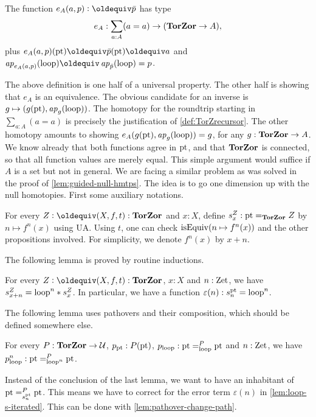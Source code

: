 \documentclass[a4,12pt]{amsart}
\begin{document}
\begin{definition}\label{def:TorZrecursor}
The function $e_A(a,p) \defeq \bar{p}$ has type
\[
e_A : \sum_{a:A}(a=a) \to (\mathbf{TorZor} \to A),
\]
plus $e_A(a,p)(\pt) \jdeq \bar{p}(\pt) \jdeq a$ and 
$\ap{e_A(a,p)}(\Zloop)\jdeq\ap{\bar{p}}(\Zloop) = p$.
\end{definition}

The above definition is one half of a universal property.
The other half is showing that $e_A$ is an equivalence.
The obvious candidate for an inverse is 
$g\mapsto (g({\mathord{\mathrm{pt}}}),\mathop{{\it ap}_{g}}(\mathrm{loop}))$.
The homotopy for the roundtrip starting in $\sum_{a:A}(a=a)$
is precisely the justification of \cref{def:TorZrecursor}.
The other homotopy amounts to showing
$e_A(g({\mathord{\mathrm{pt}}}),\mathop{{\it ap}_{g}}(\mathrm{loop})) = g$, for any $g:\mathbf{TorZor}\to A$.
We know already that both functions agree in ${\mathord{\mathrm{pt}}}$,
and that $\mathbf{TorZor}$ is connected, so that all function values
are merely equal. This simple argument would suffice if
$A$ is a set but not in general. We are facing a similar
problem as was solved in the proof of \cref{lem:guided-null-hmtps}.
The idea is to go one dimension up with the null homotopies.
First some auxiliary notations.

\begin{definition}\label{def:loop-s-iterated}
For every $Z\defeq(X,f,t):\TorZ$ and $x:X$, 
define $s^Z_x: {\mathord{\mathrm{pt}}} =_{\mathbf{TorZor}} Z$ by $n\mapsto f^n(x)$ using UA. 
Using $t$, one can check $\mathrm{isEquiv}(n\mapsto f^n(x))$
and the other propositions involved. 
For simplicity, we denote $f^n(x)$ by $x+n$.
\end{definition}

The following lemma is proved by routine inductions.

\begin{lemma}\label{lem:loop-s-iterated}
For every $Z\defeq(X,f,t):\TorZ$, $x:X$ and $n:\mathrm{Zet}$, 
we have $s^Z_{x+n} = \mathrm{loop}^n * s^Z_x$. 
In particular, we have a function $\varepsilon(n): s^{\mathord{\mathrm{pt}}}_n = \mathrm{loop}^n$.
\end{lemma}

The following lemma uses pathovers and their composition, 
which should be defined somewhere else. 

\begin{lemma}\label{lem:p_loop-iterated}
For every $P:\mathbf{TorZor} \to \mathcal{U}$, $p_{\mathord{\mathrm{pt}}} : P({\mathord{\mathrm{pt}}})$, 
$p_{\mathrm{loop}} : {\mathord{\mathrm{pt}}} =^P_{\mathrm{loop}} {\mathord{\mathrm{pt}}}$ and $n:\mathrm{Zet}$, 
we have $p_{\mathrm{loop}}^n :  {\mathord{\mathrm{pt}}} =^P_{\mathrm{loop}^n} {\mathord{\mathrm{pt}}}$.
\end{lemma}

Instead of the conclusion of the last lemma, we want to have
an inhabitant of ${\mathord{\mathrm{pt}}} =^P_{s^{\mathord{\mathrm{pt}}}_n} {\mathord{\mathrm{pt}}}$. This means we have
to correct for the error term $\varepsilon(n)$ in \cref{lem:loop-s-iterated}.
This can be done with \cref{lem:pathover-change-path}.
\end{document}
